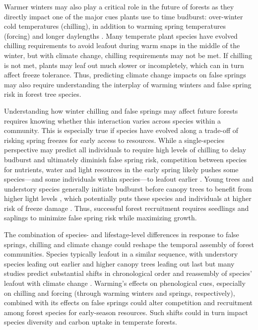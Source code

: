 \documentclass{article}\usepackage[]{graphicx}\usepackage[]{color}
\begin{document}
Warmer winters may also play a critical role in the future of forests as they directly impact one of the  major cues plants use to time budburst: over-winter cold temperatures (chilling), in addition to warming spring temperatures (forcing) and longer daylengths \citep{Chuine2016}. Many temperate plant species have evolved chilling requirements to avoid leafout during warm snaps in the middle of the winter, but with climate change, chilling requirements may not be met. If chilling is not met, plants may leaf out much slower or incompletely, which can in turn affect freeze tolerance. Thus, predicting climate change impacts on false springs may also require understanding the interplay of warming winters and false spring risk in forest tree species. 
  
Understanding how winter chilling and false springs may affect future forests requires knowing whether this interaction varies across species within a community. This is especially true if species have evolved along a trade-off of risking spring freezes for early access to resources. While a single-species perspective may predict all individuals to require high levels of chilling to delay budburst and ultimately diminish false spring risk, competition between species for nutrients, water and light resources in the early spring likely pushes some species---and some individuals within species---to leafout earlier \citep{Augspurger2013}. Young trees and understory species generally initiate budburst before canopy trees to benefit from higher light levels \citep {Augspurger2008, Vitasse2013}, which potentially puts these species and individuals at higher risk of freeze damage \citep{Vitasse2014}. Thus, successful forest recruitment requires seedlings and saplings to minimize false spring risk while maximizing growth. 
 
The combination of species- and lifestage-level differences in response to false springs, chilling and climate change could reshape the temporal assembly of forest communities. Species typically leafout in a similar sequence, with understory species leafing out earlier and higher canopy trees leafing out last but many studies predict substantial shifts in chronological order and reassembly of species' leafout with climate change \citep{Laube2014, Roberts2015}. Warming's effects on phenological cues, especially on chilling and forcing (through warming winters and springs, respectively), combined with its effects on false springs could alter competition and recruitment among forest species for early-season resources. Such shifts could in turn impact species diversity and carbon uptake in temperate forests.
  
\end{document}
